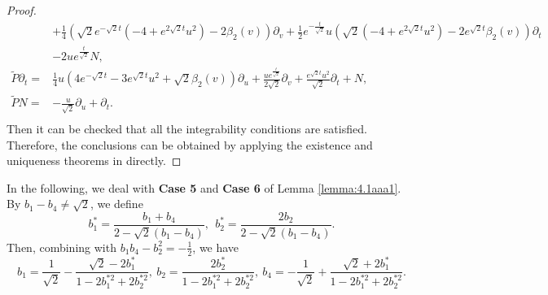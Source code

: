 \documentclass[reqno]{amsart}%
\theoremstyle{definition}
\numberwithin{equation}{section}
\begin{document}
\begin{proof}
\begin{equation}
\begin{aligned}
&+\frac{1}{4}(\sqrt{2}e^{-\sqrt{2}t}(-4+e^{2\sqrt{2}t}u^2)-2\beta_2(v))\partial_v
+\frac{1}{2}e^{-\frac{t}{\sqrt{2}}}u(\sqrt{2}(-4+e^{2\sqrt{2}t}u^2)-2e^{\sqrt{2}t} \beta_2(v))\partial_t\\
&-2ue^{\frac{t}{\sqrt{2}}}N,\\
\tilde{P}\partial_t=&\frac{1}{4}u(4e^{-\sqrt{2}t}-3e^{\sqrt{2}t}u^2+\sqrt{2} \beta_2(v))\partial_u+\frac{ue^{\frac{t}{\sqrt{2}}}}{2\sqrt{2}}\partial_v+\frac{e^{\sqrt{2}t}u^2}{\sqrt{2}}\partial_t+N,\\
\tilde{P}N=&-\frac{u}{\sqrt{2}}\partial_u+\partial_t.\\	
\end{aligned}
\end{equation}
Then it can be  checked  that all the integrability conditions are satisfied.
Therefore, the conclusions can be obtained by applying  the existence and uniqueness theorems in  \cite{K,L-T-V} directly.
\end{proof}


In the following, we deal with {\bf Case 5} and {\bf Case 6} of Lemma \ref{lemma:4.1aaa1}. By $b_1-b_4\neq\sqrt{2}$, we define
\begin{equation}\label{eqn:bibar}
b_1^*=\frac{b_1+b_4}{2-\sqrt{2}(b_1-b_4)},\ \
b_2^*=\frac{2b_2}{2-\sqrt{2}(b_1-b_4)}.
\end{equation}
Then, combining with $b_1b_4-b_2^2=-\tfrac{1}{2}$, we have
\begin{equation}\label{eqn:bi}
b_1=\frac{1}{\sqrt{2}}-\frac{\sqrt{2}-2b_1^*}{1-2b_1^{*2}+2b_2^{*2}},\
b_2=\frac{2b_2^*}{1-2b_1^{*2}+2b_2^{*2}},\
b_4=-\frac{1}{\sqrt{2}}+\frac{\sqrt{2}+2b_1^*}{1-2b_1^{*2}+2b_2^{*2}}.
\end{equation}
\end{document}
